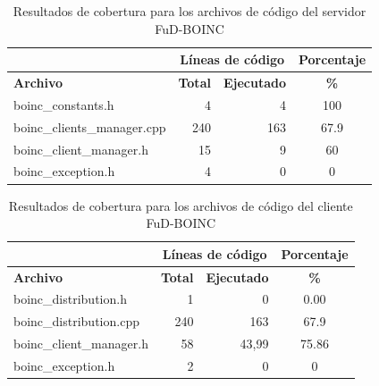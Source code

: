 \begin{table}[H]
    \begin{center}
    \begin{tabular}{|l|r|r|c|}
        \hline
        & \multicolumn{2}{|c|}{Líneas de código} & Porcentaje \\
        \hline
        \textbf{Archivo} & \textbf{Total} & \textbf{Ejecutado} & \hspace{0.2cm}\textbf{\%} \\
        \hline
        \scriptsize{boinc\_constants.h} & 4 & 4 & 100 \\
        \hline 
        \scriptsize{boinc\_clients\_manager.cpp} & 240 & 163 & 67.9 \\
        \hline 
        \scriptsize{boinc\_client\_manager.h} & 15 & 9 & 60 \\
        \hline 
        \scriptsize{boinc\_exception.h} & 4 & 0 & 0 \\
        \hline 
    \end{tabular}
    \caption{Resultados de cobertura para los archivos de código del servidor FuD-BOINC}
    \label{table:gcov:server}
    \end{center}
\end{table}

\begin{table}[H]
    \begin{center}
    \begin{tabular}{|l|r|r|c|}
        \hline
        & \multicolumn{2}{|c|}{Líneas de código} & Porcentaje \\
        \hline
        \textbf{Archivo} & \textbf{Total} & \textbf{Ejecutado} & \hspace{0.2cm}\textbf{\%} \\
        \hline
        \scriptsize{boinc\_distribution.h} & 1 & 0 & 0.00 \\
        \hline 
        \scriptsize{boinc\_distribution.cpp} & 240 & 163 & 67.9 \\
        \hline 
        \scriptsize{boinc\_client\_manager.h} & 58 & 43,99 & 75.86 \\
        \hline 
        \scriptsize{boinc\_exception.h} & 2 & 0 & 0 \\
        \hline 
    \end{tabular}
    \caption{Resultados de cobertura para los archivos de código del cliente FuD-BOINC}
    \label{table:gcov:client}
    \end{center}
\end{table}

